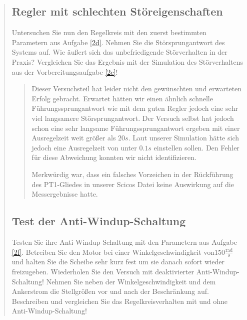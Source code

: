 \begin{quote}
\begin{quote}
        \begin{quote}
            
            
            
        \end{quote}
        
    \end{quote}
    
    
    \subsection{Regler mit schlechten Störeigenschaften}
    Untersuchen Sie nun den Regelkreis mit den zuerst bestimmten Parametern aus Aufgabe
    \ref{2d}. Nehmen Sie die Störsprungantwort des Systems auf. Wie äußert sich das unbefriedigende Störverhalten in der Praxis?
    Vergleichen Sie das Ergebnis mit der Simulation des Störverhaltens aus der Vorbereitungsaufgabe \ref{2e}!
    
    \begin{quote}
        
        Dieser Versuchsteil hat leider nicht den gewünschten und erwarteten Erfolg gebracht. Erwartet hätten wir einen
        ähnlich schnelle Führungssprungantwort wie mit dem guten Regler jedoch eine sehr viel langsamere
        Störsprungantwort. Der Versuch selbst hat jedoch schon eine sehr langsame Führungssprungantwort ergeben mit
        einer Ausregelzeit weit größer als $20 s$. Laut unserer Simulation hätte sich jedoch eine Ausregelzeit von unter
        $0.1 s$ einstellen sollen. Den Fehler für diese Abweichung konnten wir nicht identifizieren.\vspace{1em}
        
        Merkwürdig war, dass ein falsches Vorzeichen in der Rückführung des PT1-Gliedes in unserer Scicos Datei keine
        Auswirkung auf die Messergebnisse hatte. 
        
        
    \end{quote}
    
    
    \subsection{Test der Anti-Windup-Schaltung}
    Testen Sie ihre Anti-Windup-Schaltung mit den Parametern aus Aufgabe \ref{2f}. Betreiben
    Sie den Motor bei einer Winkelgeschwindigkeit von$150 \mathrm{\frac{rad}{s}}$
    und halten Sie die Scheibe
    sehr kurz fest um sie danach sofort wieder freizugeben. Wiederholen Sie den Versuch mit
    deaktivierter Anti-Windup-Schaltung! Nehmen Sie neben der Winkelgeschwindigkeit
    und dem Ankerstrom die Stellgrößen vor und nach der Beschränkung auf. Beschreiben
    und vergleichen Sie das Regelkreisverhalten mit und ohne Anti-Windup-Schaltung!
    
    \begin{quote}
        
        
        
    \end{quote}


    
    
    
    
\end{quote}

